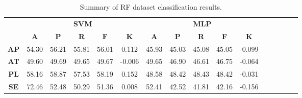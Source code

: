 \begin{landscape}
\begin{table}[htbp]
\footnotesize
\centering
\caption{Summary of RF dataset classification results.}
\label{tab:base_female}
\begin{tabular}{|c|c|c|c|c|c|c|c|c|c|c|c|c|c|c|c|}
\hline
\multirow{2}{*}{}	& \multicolumn{5}{c|}{\textbf{SVM}}												& \multicolumn{5}{c|}{\textbf{MLP}}												\\ \cline{2-11} 
					& \textbf{A}	& \textbf{P}	& \textbf{R}	& \textbf{F}	& \textbf{K}	& \textbf{A}	& \textbf{P}	& \textbf{R}	& \textbf{F}	& \textbf{K}	\\ \hline
\textbf{AP}			& 54.30			& 56.21			& 55.81			& 56.01			& 0.112			& 45.93			& 45.03			& 45.08			& 45.05			& -0.099			\\ \hline
\textbf{AT}			& 49.60			& 49.69			& 49.65			& 49.67			& -0.006			& 49.65			& 46.90			& 46.61			& 46.75			& -0.064			\\ \hline
\textbf{PL}			& 58.16			& 58.87			& 57.53			& 58.19			& 0.152			& 48.58			& 48.42			& 48.43			& 48.42			& -0.031			\\ \hline
\textbf{SE}			& 72.46			& 52.48			& 50.29			& 51.36			& 0.008			& 52.41			& 42.52			& 41.81			& 42.16			& -0.156			\\ \hline
\end{tabular}
\end{table}
\end{landscape}